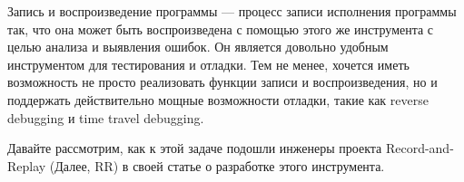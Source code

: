 Запись и воспроизведение программы — процесс записи исполнения программы так, что 
она  может быть воспроизведена с помощью этого же инструмента 
с целью анализа и выявления ошибок.
Он является довольно удобным инструментом для тестирования и отладки. Тем не менее, 
хочется иметь возможность не просто реализовать функции записи и воспроизведения, 
но и поддержать действительно мощные возможности отладки, 
такие как reverse debugging и time travel debugging.

Давайте рассмотрим, как к этой задаче подошли инженеры проекта Record-and-Replay
(Далее, RR) в своей статье \cite{rr-paper} о разработке этого инструмента.




